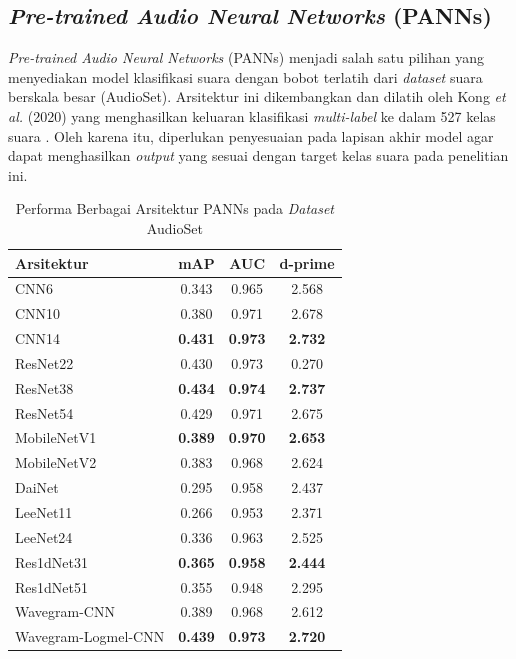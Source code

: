 \subsection{\textit{Pre-trained Audio Neural Networks} (PANNs)} \label{II.Teori8}
\textit{Pre-trained Audio Neural Networks} (PANNs) menjadi salah satu pilihan yang menyediakan model klasifikasi suara dengan bobot terlatih dari \textit{dataset} suara berskala besar (AudioSet).
Arsitektur ini dikembangkan dan dilatih oleh Kong \textit{et al.} (2020) yang menghasilkan keluaran klasifikasi \textit{multi-label} ke dalam 527 kelas suara \cite{kong2020panns}. 
Oleh karena itu, diperlukan penyesuaian pada lapisan akhir model agar dapat menghasilkan \textit{output} yang sesuai dengan target kelas suara pada penelitian ini. \par

\begin{table}[htbp]
    \centering
    \caption{Performa Berbagai Arsitektur PANNs pada \textit{Dataset} AudioSet}
    \label{tab:panns_performance}
    \begin{tabular}{lccc}
        \hline
        \textbf{Arsitektur} & \textbf{mAP} & \textbf{AUC} & \textbf{d-prime} \\
        \hline
        CNN6 & 0.343 & 0.965 & 2.568 \\
        CNN10 & 0.380 & 0.971 & 2.678 \\
        CNN14 & \textbf{0.431} & \textbf{0.973} & \textbf{2.732} \\
        \hline
        ResNet22 & 0.430 & 0.973 & 0.270 \\
        ResNet38 & \textbf{0.434} & \textbf{0.974} & \textbf{2.737} \\
        ResNet54 & 0.429 & 0.971 & 2.675 \\
        \hline
        MobileNetV1 & \textbf{0.389} & \textbf{0.970} & \textbf{2.653} \\
        MobileNetV2 & 0.383 & 0.968 & 2.624 \\
        \hline
        DaiNet & 0.295 & 0.958 & 2.437 \\
        LeeNet11 & 0.266 & 0.953 & 2.371 \\
        LeeNet24 & 0.336 & 0.963 & 2.525 \\
        Res1dNet31 & \textbf{0.365} & \textbf{0.958} & \textbf{2.444} \\
        Res1dNet51 & 0.355 & 0.948 & 2.295 \\
        \hline
        Wavegram-CNN & 0.389 & 0.968 & 2.612 \\
        Wavegram-Logmel-CNN & \textbf{0.439} & \textbf{0.973} & \textbf{2.720} \\
        \hline
    \end{tabular}
\end{table}

